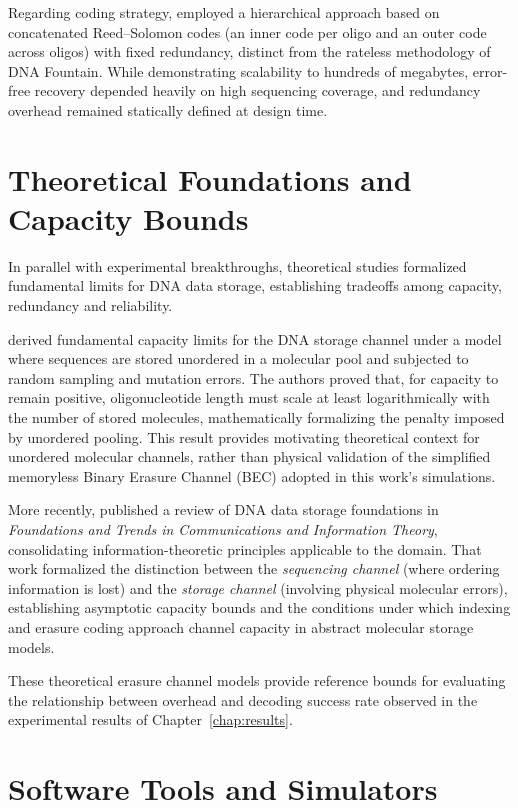 Regarding coding strategy,  employed a hierarchical approach based on concatenated Reed--Solomon codes (an inner code per oligo and an outer code across oligos) with fixed redundancy, distinct from the rateless methodology of DNA Fountain. While demonstrating scalability to hundreds of megabytes, error-free recovery depended heavily on high sequencing coverage, and redundancy overhead remained statically defined at design time.

\section{Theoretical Foundations and Capacity Bounds}
\label{sec:related_theoretical}

In parallel with experimental breakthroughs, theoretical studies formalized fundamental limits for DNA data storage, establishing tradeoffs among capacity, redundancy and reliability.

 derived fundamental capacity limits for the DNA storage channel under a model where sequences are stored unordered in a molecular pool and subjected to random sampling and mutation errors. The authors proved that, for capacity to remain positive, oligonucleotide length must scale at least logarithmically with the number of stored molecules, mathematically formalizing the penalty imposed by unordered pooling. This result provides motivating theoretical context for unordered molecular channels, rather than physical validation of the simplified memoryless Binary Erasure Channel (BEC) adopted in this work's simulations.

More recently,  published a review of DNA data storage foundations in \emph{Foundations and Trends in Communications and Information Theory}, consolidating information-theoretic principles applicable to the domain. That work formalized the distinction between the \emph{sequencing channel} (where ordering information is lost) and the \emph{storage channel} (involving physical molecular errors), establishing asymptotic capacity bounds and the conditions under which indexing and erasure coding approach channel capacity in abstract molecular storage models.

These theoretical erasure channel models provide reference bounds for evaluating the relationship between overhead and decoding success rate observed in the experimental results of Chapter~\ref{chap:results}.

\section{Software Tools and Simulators}
\label{sec:related_simulators}

